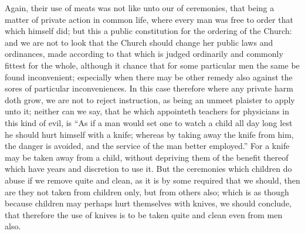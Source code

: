 Again, their use of meats was not like unto our of ceremonies, that being a matter of private action in common life, where every man was free to order that which himself did; but this a public constitution for the ordering of the Church: and we are not to look that the Church should change her public laws and ordinances, made according to that which is judged ordinarily and commonly fittest for the whole, although it chance that for some particular men the same be found inconvenient; especially when there may be other remedy also against the sores of particular inconveniences. In this case therefore where any private harm doth grow, we are not to reject instruction, as being an unmeet plaister to apply unto it; neither can we say, that he which appointeth teachers for physicians in this kind of evil, is “As if a man would set one to watch a child all day long lest he should hurt himself with a knife; whereas by taking away the knife from him, the danger is avoided, and the service of the man better employed.” For a knife may be taken away from a child, without depriving them of the benefit thereof which have years and discretion to use it. But the ceremonies which children do abuse if we remove quite and clean, as it is by some required that we should, then are they not taken from children only, but from others also; which is as though because children may perhaps hurt themselves with knives,  we should conclude, that therefore the use of knives is to be taken quite and clean even from men also.

